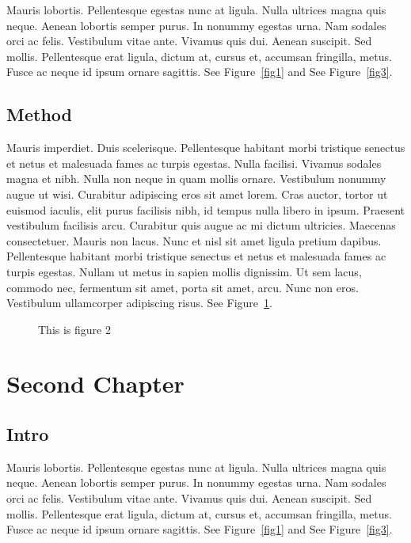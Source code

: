 ﻿\documentclass{report}
\begin{document}
Mauris lobortis. Pellentesque egestas nunc at ligula. Nulla ultrices magna quis
neque. Aenean lobortis semper purus. In nonummy egestas urna. Nam sodales orci
ac felis. Vestibulum vitae ante. Vivamus quis dui. Aenean suscipit. Sed mollis.
Pellentesque erat ligula, dictum at, cursus et, accumsan fringilla, metus. Fusce
ac neque id ipsum ornare sagittis.  See Figure~\ref{fig1} and See Figure~\ref{fig3}.

\section{Method}
Mauris imperdiet. Duis scelerisque. Pellentesque habitant morbi tristique
senectus et netus et malesuada fames ac turpis egestas. Nulla facilisi. Vivamus
sodales magna et nibh. Nulla non neque in quam mollis ornare. Vestibulum nonummy
augue ut wisi. Curabitur adipiscing eros sit amet lorem. Cras auctor, tortor ut
euismod iaculis, elit purus facilisis nibh, id tempus nulla libero in ipsum.
Praesent vestibulum facilisis arcu. Curabitur quis augue ac mi dictum ultricies.
Maecenas consectetuer. Mauris non lacus. Nunc et nisl sit amet ligula pretium
dapibus. Pellentesque habitant morbi tristique senectus et netus et malesuada
fames ac turpis egestas. Nullam ut metus in sapien mollis dignissim. Ut sem
lacus, commodo nec, fermentum sit amet, porta sit amet, arcu. Nunc non eros.
Vestibulum ullamcorper adipiscing risus.  See Figure~\ref{fig2}.

\begin{figure}[h]
\begin{center}
\vspace{2cm}
\label{fig2}
\caption{This is figure 2}
\end{center}
\end{figure}

\chapter{Second Chapter}

\section{Intro}
Mauris lobortis. Pellentesque egestas nunc at ligula. Nulla ultrices magna quis
neque. Aenean lobortis semper purus. In nonummy egestas urna. Nam sodales orci
ac felis. Vestibulum vitae ante. Vivamus quis dui. Aenean suscipit. Sed mollis.
Pellentesque erat ligula, dictum at, cursus et, accumsan fringilla, metus. Fusce
ac neque id ipsum ornare sagittis.  See Figure~\ref{fig1} and See Figure~\ref{fig3}.
\end{document}
